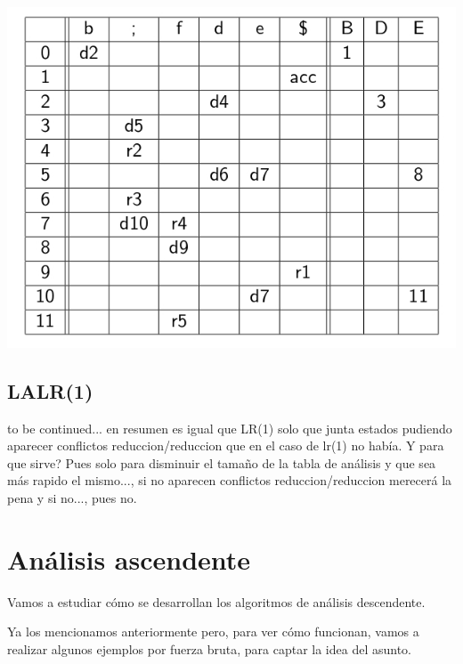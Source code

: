 \documentclass{apuntes}
\begin{document}
\begin{example}
\begin{center}
\includegraphics[scale=0.4]{img/tablaanalisisslr1.jpg}
\end{center}
\end{example}

\subsection{LALR(1)}

to be continued... en resumen es igual que LR(1) solo que junta estados pudiendo aparecer conflictos reduccion/reduccion que en el caso de lr(1) no había. Y para que sirve? Pues solo para disminuir el tamaño de la tabla de análisis y que sea más rapido el mismo..., si no aparecen conflictos reduccion/reduccion merecerá la pena y si no..., pues no.

\section{Análisis ascendente}
Vamos a estudiar cómo se desarrollan los algoritmos de análisis descendente.

Ya los mencionamos anteriormente pero, para ver cómo funcionan, vamos a realizar algunos ejemplos por fuerza bruta, para captar la idea del asunto.
\end{document}
